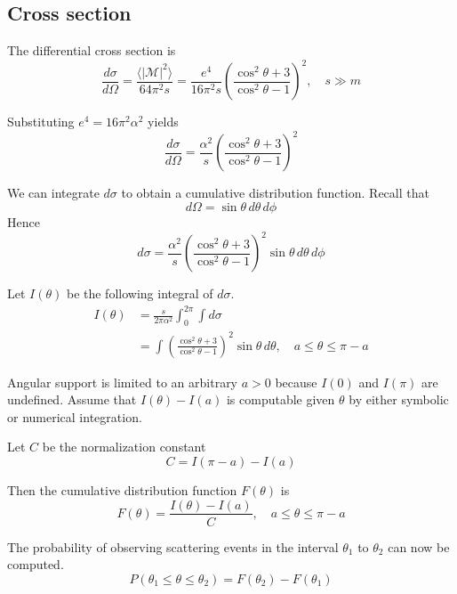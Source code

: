 \documentclass[12pt]{article}
\begin{document}
\subsection*{Cross section}
The differential cross section is
\begin{equation*}
\frac{d\sigma}{d\Omega}
=\frac{\langle|\mathcal{M}|^2\rangle}{64\pi^2s}
=\frac{e^4}{16\pi^2s}
\left(
\frac{\cos^2\theta+3}{\cos^2\theta-1}
\right)^2,\quad s\gg m
\end{equation*}

\noindent
Substituting $e^4=16\pi^2\alpha^2$ yields
\begin{equation*}
\frac{d\sigma}{d\Omega}=\frac{\alpha^2}{s}
\left(
\frac{\cos^2\theta+3}{\cos^2\theta-1}
\right)^2
\end{equation*}

\noindent
We can integrate $d\sigma$ to obtain a cumulative distribution function.
Recall that
\begin{equation*}
d\Omega=\sin\theta\,d\theta\,d\phi
\end{equation*}
Hence
\begin{equation*}
d\sigma=\frac{\alpha^2}{s}
\left(
\frac{\cos^2\theta+3}{\cos^2\theta-1}
\right)^2
\sin\theta\,d\theta\,d\phi
\end{equation*}

\noindent
Let $I(\theta)$ be the following integral of $d\sigma$.
\begin{align*}
I(\theta)&=\frac{s}{2\pi\alpha^2}\int_0^{2\pi}\int d\sigma
\\
&=\int
\left(
\frac{\cos^2\theta+3}{\cos^2\theta-1}
\right)^2
\sin\theta\,d\theta,
\quad a\le\theta\le\pi-a
\end{align*}

\noindent
Angular support is limited to an arbitrary $a>0$ because $I(0)$ and $I(\pi)$ are undefined.
Assume that $I(\theta)-I(a)$ is computable given $\theta$ by either symbolic or numerical integration.

\bigskip
\noindent
Let $C$ be the normalization constant
\begin{equation*}
C=I(\pi-a)-I(a)
\end{equation*}

\noindent
Then the cumulative distribution function $F(\theta)$ is
\begin{equation*}
F(\theta)=\frac{I(\theta)-I(a)}{C},\quad a\le\theta\le\pi-a
\end{equation*}

\noindent
The probability of observing scattering events in the interval $\theta_1$ to $\theta_2$
can now be computed.
\begin{equation*}
P(\theta_1\le\theta\le\theta_2)=F(\theta_2)-F(\theta_1)
\end{equation*}
\end{document}
